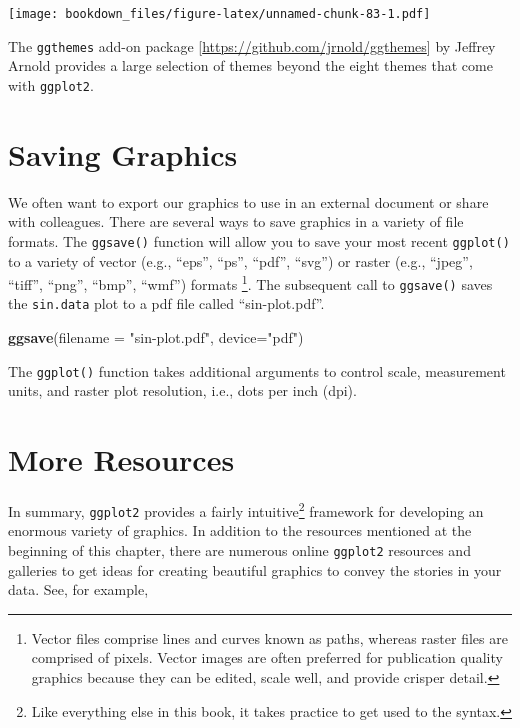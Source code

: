\documentclass[
]{krantz}
\makeatletter
\newenvironment{Shaded}{\begin{snugshade}}{\end{snugshade}}
\newcommand{\DataTypeTok}[1]{\textcolor[rgb]{0.27,0.27,0.27}{#1}}
\newcommand{\KeywordTok}[1]{\textcolor[rgb]{0.27,0.27,0.27}{\textbf{#1}}}
\newcommand{\NormalTok}[1]{#1}
\newcommand{\StringTok}[1]{\textcolor[rgb]{0.5,0.5,0.5}{#1}}
\newenvironment{kframe}{%
\medskip{}
\setlength{\fboxsep}{.8em}
 \def\at@end@of@kframe{}%
 \ifinner\ifhmode%
  \def\at@end@of@kframe{\end{minipage}}%
  \begin{minipage}{\columnwidth}%
 \fi\fi%
 \def\FrameCommand##1{\hskip\@totalleftmargin \hskip-\fboxsep
 \colorbox{shadecolor}{##1}\hskip-\fboxsep
     \hskip-\linewidth \hskip-\@totalleftmargin \hskip\columnwidth}%
 \MakeFramed {\advance\hsize-\width
   \@totalleftmargin\z@ \linewidth\hsize
   \@setminipage}}%
 {\par\unskip\endMakeFramed%
 \at@end@of@kframe}
\renewenvironment{Shaded}{\begin{kframe}}{\end{kframe}}
\makeatother
\begin{document}
\texttt{[image: bookdown\_files/figure-latex/unnamed-chunk-83-1.pdf]}

The \texttt{ggthemes} add-on package {[}\url{https://github.com/jrnold/ggthemes}{]} by Jeffrey Arnold provides a large selection of themes beyond the eight themes that come with \texttt{ggplot2}.

\hypertarget{saving-graphics}{%
\section{Saving Graphics}\label{saving-graphics}}

We often want to export our graphics to use in an external document or share with colleagues. There are several ways to save graphics in a variety of file formats. The \texttt{ggsave()} function will allow you to save your most recent \texttt{ggplot()} to a variety of vector (e.g., ``eps'', ``ps'', ``pdf'', ``svg'') or raster (e.g., ``jpeg'', ``tiff'', ``png'', ``bmp'', ``wmf'') formats \footnote{Vector files comprise lines and curves known as paths, whereas raster files are comprised of pixels. Vector images are often preferred for publication quality graphics because they can be edited, scale well, and provide crisper detail.}. The subsequent call to \texttt{ggsave()} saves the \texttt{sin.data} plot to a pdf file called ``sin-plot.pdf''.

\begin{Shaded}
\begin{Highlighting}[]
\KeywordTok{ggsave}\NormalTok{(}\DataTypeTok{filename =} \StringTok{"sin{-}plot.pdf"}\NormalTok{, }\DataTypeTok{device=}\StringTok{"pdf"}\NormalTok{)}
\end{Highlighting}
\end{Shaded}

The \texttt{ggplot()} function takes additional arguments to control scale, measurement units, and raster plot resolution, i.e., dots per inch (dpi).

\hypertarget{more-resources}{%
\section{More Resources}\label{more-resources}}

In summary, \texttt{ggplot2} provides a fairly intuitive\footnote{Like everything else in this book, it takes practice to get used to the syntax.} framework for developing an enormous variety of graphics. In addition to the resources mentioned at the beginning of this chapter, there are numerous online \texttt{ggplot2} resources and galleries to get ideas for creating beautiful graphics to convey the stories in your data. See, for example,
\end{document}
